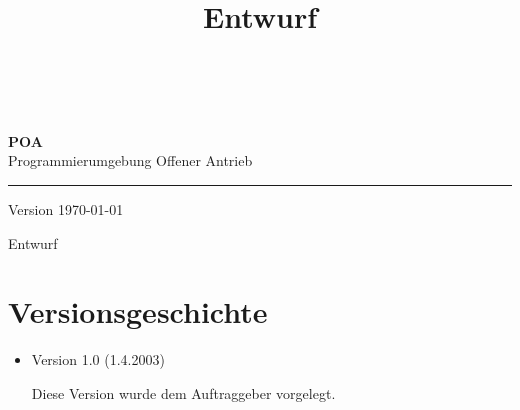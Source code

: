 \documentclass[a4paper,titlepage,12pt,ngerman]{scrbook}
\title {\huge \product\\[0.5cm]\large Entwurf\\[0.5cm] \version
  \\[1cm] \Large \company}
\newcommand\version{Version \today \xspace}
\begin{document}

\begin{titlepage}
\renewcommand{\thefootnote}{\fnsymbol{footnote}}
{\Huge
\raggedright
\textbf{POA} \\
\huge Programmierumgebung Offener Antrieb
\rule{\textwidth}{0.75pt}
\par
}
\begin{flushleft}
\normalsize
\version
\end{flushleft}
\vfill

{\parindent=0cm
\Huge Entwurf
}


\setcounter{footnote}{0}
\end{titlepage}


\section*{Versionsgeschichte}

\begin{itemize}

\item Version 1.0 (1.4.2003)

  Diese Version wurde dem Auftraggeber vorgelegt.

\end{itemize}


\tableofcontents









\appendix
\end{document}
